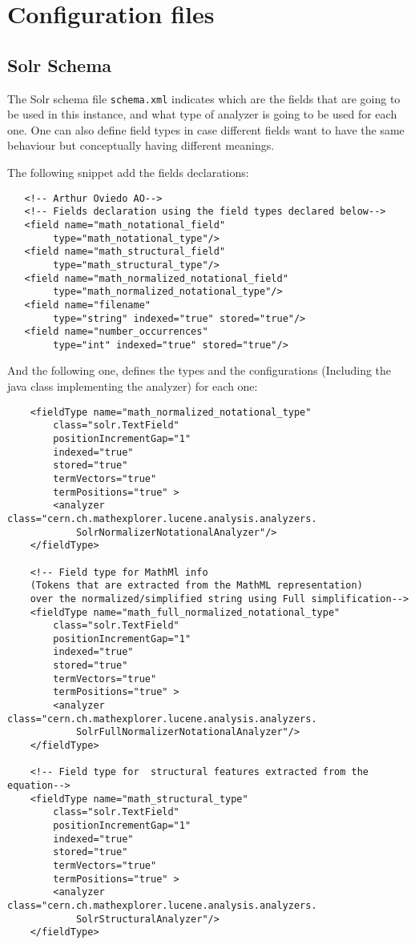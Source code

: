 \chapter{Configuration files}
\label{appendix-conf_files}

\section{Solr Schema}
The Solr schema file \verb|schema.xml| indicates which are the fields that are going to be used in this instance, and what type of analyzer is going to be used for each one. One can also define field types in case different fields want to have the same behaviour but conceptually having different meanings. 

The following snippet add the fields declarations:

\begin{verbatim}
   <!-- Arthur Oviedo AO-->
   <!-- Fields declaration using the field types declared below-->
   <field name="math_notational_field" 
   		type="math_notational_type"/>
   <field name="math_structural_field" 
   		type="math_structural_type"/>
   <field name="math_normalized_notational_field" 
   		type="math_normalized_notational_type"/>
   <field name="filename" 
   		type="string" indexed="true" stored="true"/>
   <field name="number_occurrences" 
   		type="int" indexed="true" stored="true"/>
\end{verbatim}

And the following one, defines the types and the configurations (Including the java class implementing the analyzer) for each one:

\begin{verbatim}
	<fieldType name="math_normalized_notational_type" 
		class="solr.TextField" 
		positionIncrementGap="1"
		indexed="true" 
		stored="true" 
		termVectors="true" 
		termPositions="true" >
		<analyzer class="cern.ch.mathexplorer.lucene.analysis.analyzers.
			SolrNormalizerNotationalAnalyzer"/>
	</fieldType>
	
	<!-- Field type for MathMl info 
	(Tokens that are extracted from the MathML representation)
	over the normalized/simplified string using Full simplification-->
	<fieldType name="math_full_normalized_notational_type" 
		class="solr.TextField" 
		positionIncrementGap="1"
		indexed="true" 
		stored="true" 
		termVectors="true" 
		termPositions="true" >
		<analyzer class="cern.ch.mathexplorer.lucene.analysis.analyzers.
			SolrFullNormalizerNotationalAnalyzer"/>
	</fieldType>
	
	<!-- Field type for  structural features extracted from the equation-->
	<fieldType name="math_structural_type" 
		class="solr.TextField" 
		positionIncrementGap="1"
		indexed="true" 
		stored="true" 
		termVectors="true" 
		termPositions="true" >
		<analyzer class="cern.ch.mathexplorer.lucene.analysis.analyzers.
			SolrStructuralAnalyzer"/>
	</fieldType>

\end{verbatim}
 
